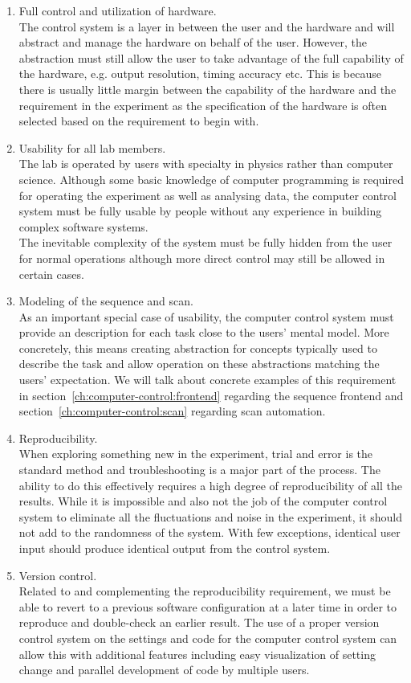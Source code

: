 \begin{enumerate}
\item Full control and utilization of hardware.\\
  The control system is a layer in between the user and the hardware
  and will abstract and manage the hardware on behalf of the user.
  However, the abstraction must still allow the user to take advantage of
  the full capability of the hardware, e.g. output resolution, timing accuracy etc.
  This is because there is usually little margin between the capability of the hardware
  and the requirement in the experiment as the specification of the hardware
  is often selected based on the requirement to begin with.
\item Usability for all lab members.\\
  The lab is operated by users with specialty in physics rather than computer science.
  Although some basic knowledge of computer programming is required for operating
  the experiment as well as analysing data,
  the computer control system must be fully usable by people without any experience
  in building complex software systems.\\
  The inevitable complexity of the system must be fully hidden from the user
  for normal operations although more direct control may still be allowed in certain cases.
\item Modeling of the sequence and scan.\\
  As an important special case of usability,
  the computer control system must provide an description for each task close to
  the users' mental model.
  More concretely, this means creating abstraction for concepts
  typically used to describe the task and allow operation on these abstractions
  matching the users' expectation.
  We will talk about concrete examples of this requirement
  in section~\ref{ch:computer-control:frontend} regarding the sequence frontend
  and section~\ref{ch:computer-control:scan} regarding scan automation.
\item Reproducibility.\\
  When exploring something new in the experiment,
  trial and error is the standard method and troubleshooting is a major part of the process.
  The ability to do this effectively requires a high degree of reproducibility of all the results.
  While it is impossible and also not the job of the computer control system to
  eliminate all the fluctuations and noise in the experiment,
  it should not add to the randomness of the system.
  With few exceptions, identical user input should produce identical output from
  the control system.
\item Version control.\\
  Related to and complementing the reproducibility requirement,
  we must be able to revert to a previous software configuration at a later time
  in order to reproduce and double-check an earlier result.
  The use of a proper version control system on the settings and code for
  the computer control system can allow this with additional features
  including easy visualization of setting change and parallel development of code
  by multiple users.
\end{enumerate}

